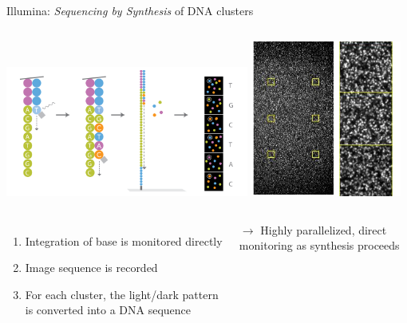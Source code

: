 \documentclass[10pt]{beamer}
\begin{document}
\begin{frame}{Illumina: \textit{Sequencing by Synthesis} of DNA clusters}
	\begin{columns}[T]
		\column{\dimexpr\paperwidth-10pt}
		\includegraphics[width=0.6\textwidth]{./figures/illumina3.png}
		\includegraphics[width=0.37\textwidth]{./figures/flowcell.jpg}
	\end{columns}
	\begin{columns}[T,onlytextwidth]
		\column{\textwidth}
		\vspace{2em}
		\begin{enumerate}
			\item Integration of base is monitored directly
			\item Image sequence is recorded  
			\item For each cluster, the light/dark pattern is converted into a DNA sequence
		\end{enumerate}
		\alert{$\rightarrow$ Highly parallelized, direct monitoring as synthesis proceeds}
	\end{columns}
\end{frame}
\end{document}
